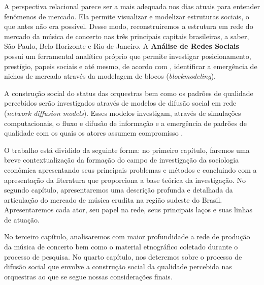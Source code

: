 \documentclass[a4paper, 12pt, openright, oneside, german, french, english, brazil]{abntex2}
\begin{document}
	A perspectiva relacional parece ser a mais adequada nos dias atuais para entender fenômenos de mercado. Ela permite visualizar e modelizar estruturas sociais, o que antes não era possível. Desse modo, reconstruiremos a estrutura em rede do mercado da música de concerto nas três principais capitais brasileiras, a saber, São Paulo, Belo Horizonte e Rio de Janeiro. A \textbf{Análise de Redes Sociais} possui um ferramental analítico próprio que permite investigar posicionamento, prestígio, papeis sociais e até mesmo, de acordo com , identificar a emergência de nichos de mercado através da modelagem de blocos (\textit{blockmodeling}).
	
	A construção social do status das orquestras bem como os padrões de qualidade percebidos serão investigados através de modelos de difusão social em rede (\textit{network diffusion models}). Esses modelos investigam, através de simulações computacionais, o fluxo e difusão de informação e a emergência de padrões de qualidade com os quais os atores assumem compromisso \cite{valente2005network}.
	
	
	
	
	
	
	
	
	O trabalho está dividido da seguinte forma: no primeiro capítulo, faremos uma breve contextualização da formação do campo de investigação da sociologia econômica apresentando seus principais problemas e métodos e concluindo com a apresentação da literatura que proporciona a base teórica da investigação. No segundo capítulo, apresentaremos uma descrição profunda e detalhada da articulação do mercado de música erudita na região sudeste do Brasil. Apresentaremos cada ator, seu papel na rede, seus principais laços e suas linhas de atuação.
	
	No terceiro capítulo, analisaremos com maior profundidade a rede de produção da música de concerto bem como o material etnográfico coletado durante o processo de pesquisa. No quarto capítulo, nos deteremos sobre o processo de difusão social que envolve a construção social da qualidade percebida nas orquestras ao que se segue nossas considerações finais.
	
	
\end{document}
